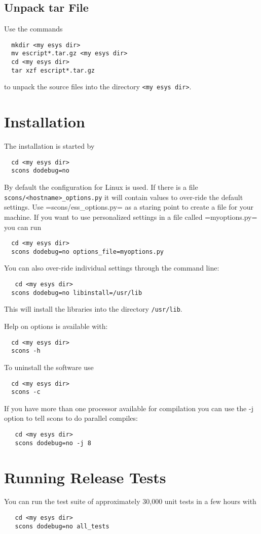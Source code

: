 \subsection{Unpack tar File}
  
Use the commands

\begin{verbatim}
  mkdir <my esys dir>
  mv escript*.tar.gz <my esys dir>
  cd <my esys dir>
  tar xzf escript*.tar.gz
\end{verbatim}

to unpack the source files into the directory \verb|<my esys dir>|.

\section{Installation}

The installation is started by 
\begin{verbatim}
  cd <my esys dir>
  scons dodebug=no
\end{verbatim}
By default the configuration for Linux is used. If there is a file \verb|scons/<hostname>_options.py| it will contain values to over-ride the default settings. Use =scons/ess_options.py= as a staring point to create a file for your machine. If you want to use personalized settings in a file called =myoptions.py= you can run
\begin{verbatim}
  cd <my esys dir>
  scons dodebug=no options_file=myoptions.py
\end{verbatim}
You can also over-ride individual settings through the command line:
\begin{verbatim}
   cd <my esys dir>
  scons dodebug=no libinstall=/usr/lib
\end{verbatim}
This will install the libraries into the directory \verb|/usr/lib|. 

Help on options is available with:
\begin{verbatim}
  cd <my esys dir>
  scons -h
\end{verbatim}
To uninstall the software use
\begin{verbatim}
  cd <my esys dir>
  scons -c
\end{verbatim}

If you have more than one processor available for compilation you can use the -j option to tell scons to do parallel compiles:
\begin{verbatim}
   cd <my esys dir>
   scons dodebug=no -j 8
\end{verbatim}
\section{Running Release Tests}
You can run the test suite of approximately 30,000 unit tests in a few hours with
\begin{verbatim}
   cd <my esys dir>
   scons dodebug=no all_tests
\end{verbatim}


